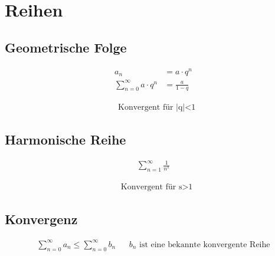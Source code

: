 \section{Reihen}
\subsection{Geometrische Folge}

\begin{boxleft}
\end{boxleft}\begin{boxrightshaded}
\begin{align*}
a_n&=a\cdot q^n\\
\sum_{n=0}^\infty a\cdot q^n&=\frac{a}{1-q}
\end{align*}
\end{boxrightshaded}

\begin{boxshaded}
\begin{align*}
&\text{Konvergent für |q|<1}
\end{align*}
\end{boxshaded}

\subsection{Harmonische Reihe}

\begin{boxleft}
\end{boxleft}\begin{boxrightshaded}
\begin{align*}
\sum_{n=1}^\infty \frac{1}{n^s}
\end{align*}
\end{boxrightshaded}

\begin{boxshaded}
\begin{align*}
&\text{Konvergent für s>1}
\end{align*}
\end{boxshaded}


\subsection{Konvergenz}

\begin{boxleft}
\end{boxleft}\begin{boxrightshaded}
\begin{align*}
\sum_{n=0}^\infty a_n\leq\sum_{n=0}^\infty b_n&&\text{$b_n$ ist eine bekannte konvergente Reihe}
\end{align*}
\end{boxrightshaded}

